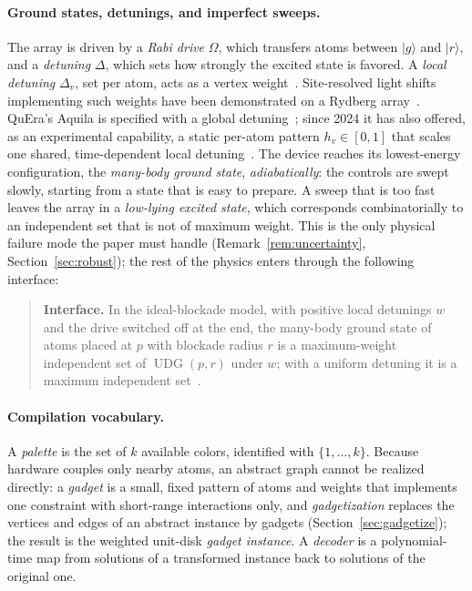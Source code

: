 \documentclass[a4paper,fleqn]{cas-sc}
\newcommand{\UDG}{\operatorname{UDG}}
\begin{document}
\paragraph{Ground states, detunings, and imperfect sweeps.} The array is driven by a
\emph{Rabi drive} $\Omega$, which transfers atoms between $\lvert g\rangle$ and
$\lvert r\rangle$, and a \emph{detuning} $\Delta$, which sets how strongly the excited
state is favored. A \emph{local detuning} $\Delta_v$, set per atom, acts as a vertex
weight~\cite{Pichler2018}. Site-resolved light shifts implementing such weights have
been demonstrated on a Rydberg array~\cite{deOliveira2025}. QuEra's Aquila is
specified with a global detuning~\cite{Wurtz2023}; since 2024 it has also offered, as
an experimental capability, a static per-atom pattern $h_v\in[0,1]$ that scales one
shared, time-dependent local detuning~\cite{Komar2024}.
The device reaches its lowest-energy configuration, the \emph{many-body ground
state}, \emph{adiabatically}: the controls are swept slowly, starting from a state that
is easy to prepare. A sweep that is too fast leaves the array in a \emph{low-lying
excited state}, which corresponds combinatorially to an independent set that is not of
maximum weight. This is the only physical failure mode the paper must handle
(Remark~\ref{rem:uncertainty}, Section~\ref{sec:robust}); the rest of the physics
enters through the following interface:
\begin{quote}
\textbf{Interface.} In the ideal-blockade model, with positive local detunings $w$
and the drive switched off at the end, the many-body ground state of atoms placed at
$p$ with blockade radius $r$ is a maximum-weight independent set of $\UDG(p,r)$ under
$w$; with a uniform detuning it is a maximum independent set~\cite{Ebadi2022}.
\end{quote}

\paragraph{Compilation vocabulary.} A \emph{palette} is the set of $k$ available
colors, identified with $\{1,\dots,k\}$. Because hardware couples only nearby atoms,
an abstract graph cannot be realized directly: a \emph{gadget} is a small, fixed
pattern of atoms and weights that implements one constraint with short-range
interactions only, and \emph{gadgetization} replaces the vertices and edges of an
abstract instance by gadgets (Section~\ref{sec:gadgetize}); the result is the weighted
unit-disk \emph{gadget instance}. A \emph{decoder} is a polynomial-time map from
solutions of a transformed instance back to solutions of the original one.
\end{document}
